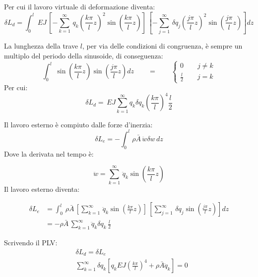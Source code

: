 Per cui il lavoro virtuale di deformazione diventa:
\begin{equation*}
    \delta L_d=\int_0^l \,EJ \,\left[ - \sum^\infty_{k=1}\,q_k   \left(\frac{k\pi}{l}z\right)^2  \sin{\left(\frac{k\pi}{l}z\right)}    \right]\, 
    \left[  - \sum^\infty_{j=1}\,\delta q_j   \left(\frac{j\pi}{l}z\right)^2  \sin{\left(\frac{j\pi}{l}z\right)}  \right]dz
\end{equation*}


La lunghezza della trave $l$, per via delle condizioni di congruenza,  è sempre un multiplo del periodo della sinusoide, di conseguenza:
\begin{equation*}
\int_0^l \,\sin{\left(\frac{k\pi}{l}z\right)} \sin{\left(\frac{j\pi}{l}z\right)}dz \qquad=\qquad
\begin{cases}
    0\qquad j\neq k\\
    \frac{l}{2} \qquad j=k
\end{cases}
\end{equation*}
Per cui:
\begin{equation*}
       \delta L_d= \,EJ\sum^\infty_{k=1} q_k \delta q_k  \left(\frac{k\pi}{l}\right)^4 \frac{l}{2}
\end{equation*}

Il lavoro esterno è compiuto dalle forze d'inerzia:
\begin{equation*}
    \delta L_e=-\int_0^l \rho \bar{A}\,\ddot{w} \delta w\,dz
\end{equation*}
Dove la derivata nel tempo è:

\begin{equation*}
    \ddot{w}= \sum^\infty_{k=1}\,\ddot{q}_k\sin{\left(\frac{k\pi}{l}z\right)}
\end{equation*}
Il lavoro esterno diventa:

\begin{align*}
    \delta L_e&=\int_0^l \,\rho\bar{A} \,\left[ \sum^\infty_{k=1}\,\ddot{q}_k\sin{\left(\frac{k\pi}{l}z\right)}   \right]\, 
    \left[   \sum^\infty_{j=1}\,\delta q_j   \sin{\left(\frac{j\pi}{l}z\right)}  \right]dz\\
    &=-\rho\bar{A} \,\sum^\infty_{k=1} \ddot{q}_k \delta q_k\,\frac{l}{2}
\end{align*}

Scrivendo il PLV:
\begin{align*}
  &  \delta L_d=\delta L_e\\
   & \sum^\infty_{k=1}  \delta q_k  \left[q_k EJ        \left(\frac{k\pi}{l}\right)^4    +\rho \bar{A}\ddot{q}_k\right]=0
\end{align*}

